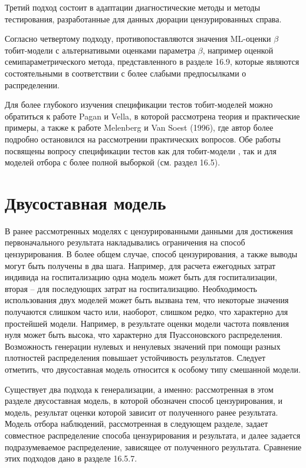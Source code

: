 Третий подход состоит в адаптации диагностические методы и методы тестирования, разработанные для данных дюрации цензурированных справа.


Согласно четвертому подходу, противопоставляются значения ML-оценки $\beta$ тобит-модели с альтернативыми оценками параметра $\beta$, например оценкой семипараметрического метода, представленного в разделе 16.9, которые являются состоятельными в соответствии с более слабыми предпосылками о распределении.

Для более глубокого изучения спецификации тестов тобит-моделей можно обратиться к работе Pagan и Vella, в которой рассмотрена теория и практические примеры, а также к работе Melenberg и Van Soest (1996), где автор более подробно остановился на рассмотрении практических вопросов. Обе работы посвящены вопросу спецификации тестов как для тобит-модели , так и для моделей отбора с более полной выборкой (см. раздел 16.5).


\section{Двусоставная модель}

В ранее рассмотренных моделях с цензурированными данными для достижения первоначального результата накладывались ограничения на способ цензурирования. В более общем случае, способ цензурирования, а также выводы могут быть получены в два шага. Например, для расчета ежегодных затрат индивида на госпитализацию одна модель может быть для госпитализации, вторая – для последующих затрат на госпитализацию. Необходимость использования двух моделей может быть вызвана тем, что некоторые значения получаются слишком часто или, наоборот, слишком редко, что характерно для простейшей модели. Например, в результате оценки модели частота появления нуля может быть высока, что характерно для Пуассоновского распределения. Возможность генерации нулевых и ненулевых значений при помощи разных плотностей распределения повышает устойчивость результатов. Следует отметить, что двусоставная модель относится к особому типу смешанной модели.

Существует два подхода к генерализации, а именно: рассмотренная в этом разделе двусоставная модель, в которой обозначен способ цензурирования, и модель, результат оценки которой зависит от полученного ранее результата. Модель отбора наблюдений, рассмотренная в следующем разделе, задает совместное распределение способа цензурирования и результата, и далее задается подразумеваемое распределение, зависящее от полученного результата. Сравнение этих подходов дано в разделе 16.5.7.

